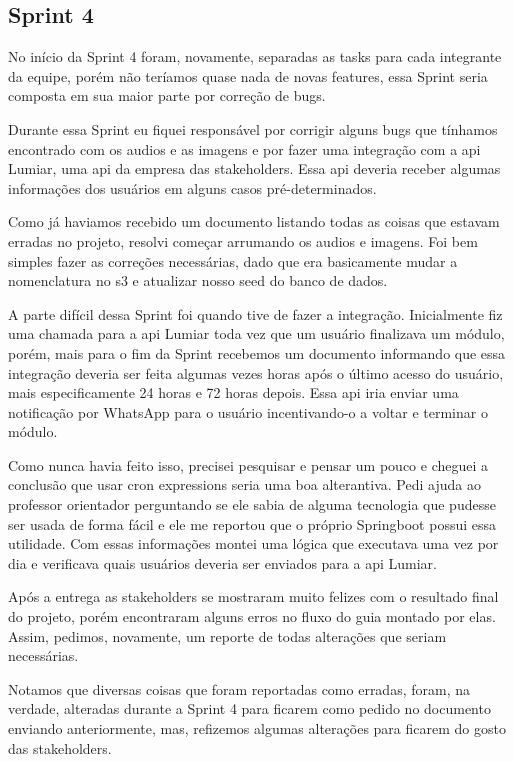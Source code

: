 \subsection{Sprint 4}

No início da Sprint 4 foram, novamente, separadas as tasks para cada integrante da equipe, porém não teríamos quase nada de novas features, essa Sprint seria composta em sua maior parte por correção de bugs.

Durante essa Sprint eu fiquei responsável por corrigir alguns bugs que tínhamos encontrado com os audios e as imagens e por fazer uma integração com a \ac{api} Lumiar, uma \ac{api} da empresa das stakeholders. Essa \ac{api} deveria receber algumas informações dos usuários em alguns casos pré-determinados.

Como já haviamos recebido um documento listando todas as coisas que estavam erradas no projeto, resolvi começar arrumando os audios e imagens. Foi bem simples fazer as correções necessárias, dado que era basicamente mudar a nomenclatura no \ac{s3} e atualizar nosso seed do banco de dados.

A parte difícil dessa Sprint foi quando tive de fazer a integração. Inicialmente fiz uma chamada para a \ac{api} Lumiar toda vez que um usuário finalizava um módulo, porém, mais para o fim da Sprint recebemos um documento informando que essa integração deveria ser feita algumas vezes horas após o último acesso do usuário, mais especificamente 24 horas e 72 horas depois. Essa \ac{api} iria enviar uma notificação por WhatsApp para o usuário incentivando-o a voltar e terminar o módulo.

Como nunca havia feito isso, precisei pesquisar e pensar um pouco e cheguei a conclusão que usar cron expressions seria uma boa alterantiva. Pedi ajuda ao professor orientador perguntando se ele sabia de alguma tecnologia que pudesse ser usada de forma fácil e ele me reportou que o próprio Springboot possui essa utilidade. Com essas informações montei uma lógica que executava uma vez por dia e verificava quais usuários deveria ser enviados para a \ac{api} Lumiar.

Após a entrega as stakeholders se mostraram muito felizes com o resultado final do projeto, porém encontraram alguns erros no fluxo do guia montado por elas. Assim, pedimos, novamente, um reporte de todas alterações que seriam necessárias.

Notamos que diversas coisas que foram reportadas como erradas, foram, na verdade, alteradas durante a Sprint 4 para ficarem como pedido no documento enviando anteriormente, mas, refizemos algumas alterações para ficarem do gosto das stakeholders.
